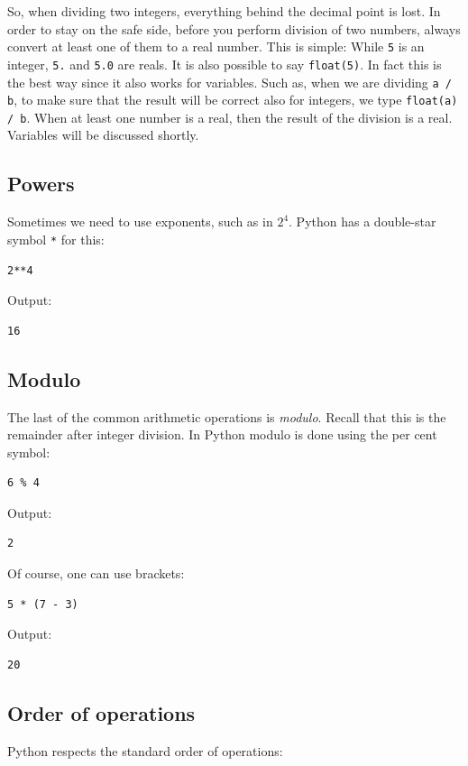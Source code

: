\vspace{4mm}
\noindent
So, when dividing two integers, everything behind the decimal point is lost.
In order to stay on the safe side, 
before you perform division of two numbers, always convert at least one of them
to a real number. This is simple: While {\tt 5} is an integer, {\tt 5.}
and {\tt 5.0} are reals. It is also possible to 
say {\tt float(5)}. In fact this is the best way since it also works for 
variables. Such as, when we are dividing {\tt a / b}, to make sure that 
the result will be correct also for integers, we type {\tt float(a) / b}. 
When at least one number is a real, then the result of the division is a real.   
Variables will be discussed shortly.

\subsection{Powers}
Sometimes we need to use exponents, such as in $2^4$. Python has a double-star
symbol {\tt **} for this:

\begin{verbatim}
2**4
\end{verbatim}
Output:

\begin{verbatim}
16
\end{verbatim}
\subsection{Modulo}
The last of the common arithmetic operations is {\em modulo}. Recall that this is the remainder 
after integer division. In Python modulo is done using the per cent symbol:

\begin{verbatim}
6 % 4
\end{verbatim}
Output:

\begin{verbatim}
2
\end{verbatim}
Of course, one can use brackets:

\begin{verbatim}
5 * (7 - 3)
\end{verbatim}
Output:

\begin{verbatim}
20
\end{verbatim}
\subsection{Order of operations}
Python respects the standard order of operations:

